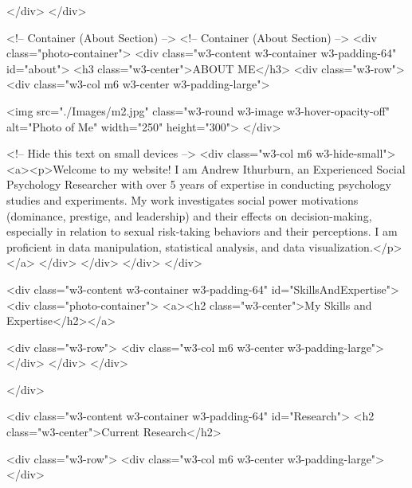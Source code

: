         </div>
    </div>
 
<!-- Container (About Section) -->
<!-- Container (About Section) -->
<div class="photo-container">
    <div class="w3-content w3-container w3-padding-64" id="about">
        <h3 class="w3-center">ABOUT ME</h3>
        <div class="w3-row">
            <div class="w3-col m6 w3-center w3-padding-large">

                <img src="./Images/m2.jpg" class="w3-round w3-image w3-hover-opacity-off" alt="Photo of Me" width="250" height="300">
            </div>

            <!-- Hide this text on small devices -->
            <div class="w3-col m6 w3-hide-small">
                <a><p>Welcome to my website! I am Andrew Ithurburn, an Experienced Social Psychology Researcher with over 5 years of expertise in conducting psychology studies and experiments. My work investigates social power motivations (dominance, prestige, and leadership) and their effects on decision-making, especially in relation to sexual risk-taking behaviors and their perceptions. I am proficient in data manipulation, statistical analysis, and data visualization.</p></a>
            </div>
        </div>
    </div>
</div>


<div class="w3-content w3-container w3-padding-64" id="SkillsAndExpertise">
    <div class="photo-container">
        <a><h2 class="w3-center">My Skills and Expertise</h2></a>

        <div class="w3-row">
            <div class="w3-col m6 w3-center w3-padding-large">
            </div>
</div>
        </div>

    </div>


    <div class="w3-content w3-container w3-padding-64" id="Research">
        <h2 class="w3-center">Current Research</h2>

        <div class="w3-row">
            <div class="w3-col m6 w3-center w3-padding-large">
            </div>

